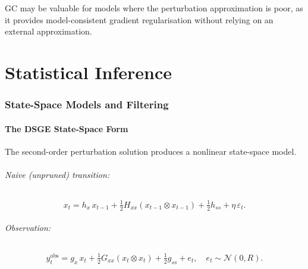 \documentclass[11pt,a4paper]{article}
\theoremstyle{definition}
\begin{document}
	GC may be valuable for models where the perturbation approximation is poor, as it provides model-consistent gradient regularisation without relying on an external approximation.
	
	
	
	\part{Statistical Inference}
	
	\section{State-Space Models and Filtering}
	\label{sec:filtering}
	
	\subsection{The DSGE State-Space Form}
	\label{sec:ss_form}
	
	The second-order perturbation solution produces a nonlinear state-space model.
	
	\paragraph{Naive (unpruned) transition:}
	\begin{equation}\label{eq:ss_trans}
		x_t = h_x \, x_{t-1} + \tfrac{1}{2} H_{xx}(x_{t-1} \otimes x_{t-1}) + \tfrac{1}{2} h_{ss} + \eta\, \varepsilon_t.
	\end{equation}
	
	\paragraph{Observation:}
	\begin{equation}\label{eq:ss_obs}
		y_t^{\mathrm{obs}} = g_x \, x_t + \tfrac{1}{2} G_{xx}(x_t \otimes x_t) + \tfrac{1}{2} g_{ss} + e_t, \quad e_t \sim \mathcal{N}(0, R).
	\end{equation}
	
\end{document}
